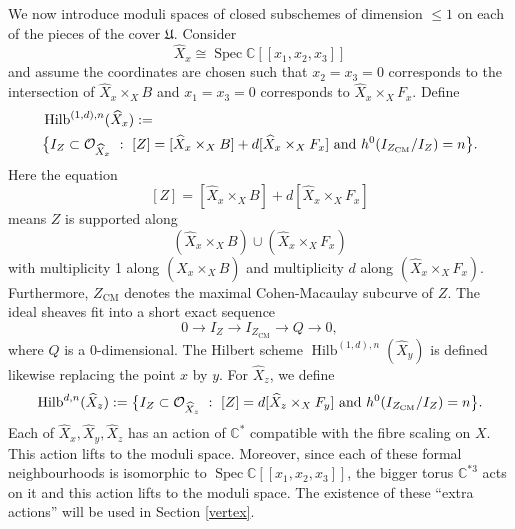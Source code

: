 \documentclass{amsart}
\theoremstyle{definition}
\newcommand{\CC} {\mathbb{C}}          %
\renewcommand{\O}{\mathcal{O}}
\newcommand{\Hilb}{\operatorname{Hilb}}
\newcommand{\CM}{\operatorname{CM}}
\newcommand{\Spec}{\operatorname{Spec}}
\begin{document}
We now introduce moduli spaces of closed subschemes of dimension $\leq 1$ on each of the pieces of the cover $\mathfrak{U}$. Consider $$\widehat{X}_x \cong \Spec \CC[\![ x_1,x_2,x_3]\!]$$ and assume the coordinates are chosen such that $x_2=x_3=0$ corresponds to the intersection of $\widehat{X}_x \times_X B$ and $x_1=x_3=0$ corresponds to $\widehat{X}_x \times_X F_x$. Define
\begin{align*}
&\Hilb^{(1,d),n}(\widehat{X}_x) := \\
&\big\{ I_Z \subset \O_{\widehat{X}_x} \ : \ [Z] = [\widehat{X}_x \times_X B] + d [\widehat{X}_x \times_X F_x] \ {\rm{and}} \ h^0(I_{Z_{\CM}} / I_Z) = n \big\}.
\end{align*}
Here the equation
$$
[Z] = [\widehat{X}_x \times_X B] + d [\widehat{X}_x \times_X F_x]
$$
means $Z$ is supported along $$(\widehat{X}_x \times_X B) \cup (\widehat{X}_x \times_X F_x)$$ with multiplicity 1 along $(\widehat{X}_x \times_X B)$ and multiplicity $d$ along $(\widehat{X}_x \times_X F_x)$. Furthermore, $Z_{\CM}$ denotes the maximal Cohen-Macaulay subcurve of $Z$. The ideal sheaves fit into a short exact sequence
$$
0 \longrightarrow I_{Z} \longrightarrow I_{Z_{\CM}} \longrightarrow Q \longrightarrow 0, 
$$
where $Q$ is a 0-dimensional. The Hilbert scheme $\Hilb^{(1,d),n}(\widehat{X}_y)$ is defined likewise replacing the point $x$ by $y$. For $\widehat{X}_z$, we define
$$
\Hilb^{d,n}(\widehat{X}_z) := \big\{ I_Z \subset \O_{\widehat{X}_z} \ : \ [Z] = d [\widehat{X}_z \times_X F_y] \ {\rm{and}} \ h^0(I_{Z_{\CM}} / I_Z) = n \big\}.
$$
Each of $\widehat{X}_x, \widehat{X}_y, \widehat{X}_z$ has an action of $\CC^*$ compatible with the fibre scaling on $X$. This action lifts to the moduli space. Moreover, since each of these formal neighbourhoods is isomorphic to $\Spec \CC[\![x_1,x_2,x_3]\!]$, the bigger torus $\CC^{*3}$ acts on it and this action lifts to the moduli space. The existence of these ``extra actions'' will be used in Section \ref{vertex}.
\end{document}
